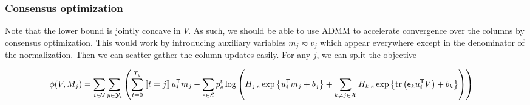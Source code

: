 \documentclass{article}
\def\e{\ensuremath{\mathsf{e}}}
\def\E{\ensuremath{\mathcal{E}}}
\def\U{\ensuremath{\mathcal{U}}}
\begin{document}
\subsubsection{Consensus optimization}
Note that the lower bound is jointly concave in $V$. As such, we should be able to use ADMM to accelerate convergence over the columns by consensus optimization.  This would work by
introducing auxiliary variables $m_j \eqsim v_j$ which appear everywhere except in the denominator of the normalization.  Then we can scatter-gather the column updates easily.
For any $j$, we can split the objective 

\begin{align*}
\phi(V, M_j) &= \sum_{i \in \U} \sum_{y \in \Y_i} \left(\sum_{t=0}^{T_y} \ind{t = j} u_i\trans m_j - 
\sum_{e \in \E} p_e^t \log\left( H_{j,e}\exp\left\{u_i\trans m_j + b_j\right\}
+ \sum_{k\neq j \in \X} H_{k,e} \exp\left\{\trace\left(\e_k u_i\trans V\right) + b_k\right\}\right) \right)
\end{align*}
\end{document}
